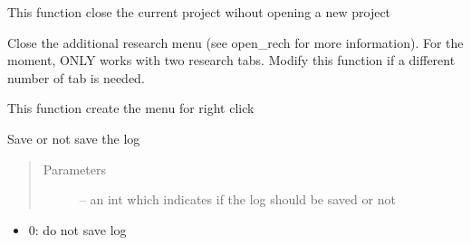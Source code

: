 \documentclass[letterpaper,10pt,english]{sphinxmanual}
\begin{document}
\begin{fulllineitems}

\begin{fulllineitems}
\label{\detokenize{index:src_GUI.Main_windows_1.MainWindows.close_project}}
This function close the current project wihout opening a new project

\end{fulllineitems}


\begin{fulllineitems}
\label{\detokenize{index:src_GUI.Main_windows_1.MainWindows.close_rech}}
Close the additional research menu (see open\_rech for more information). For the moment, ONLY works with
two research tabs. Modify this function if a different number of tab is needed.

\end{fulllineitems}


\begin{fulllineitems}
\label{\detokenize{index:src_GUI.Main_windows_1.MainWindows.create_menu_right}}
This function create the menu for right click

\end{fulllineitems}


\begin{fulllineitems}
\label{\detokenize{index:src_GUI.Main_windows_1.MainWindows.do_log}}
Save or not save the log
\begin{quote}\begin{description}
\item[{Parameters}] \leavevmode
{} -- an int which indicates if the log should be saved or not

\end{description}\end{quote}
\begin{itemize}
\item {} 
0: do not save log


\end{itemize}
\end{fulllineitems}
\end{fulllineitems}
\end{document}
